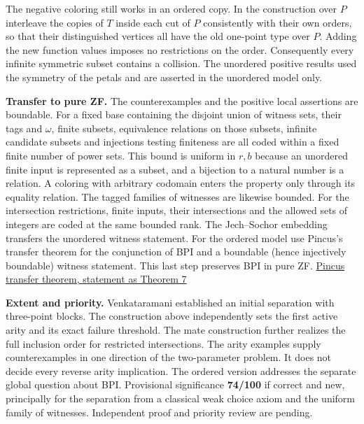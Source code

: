 \documentclass[11pt]{article}
\begin{document}
The negative coloring still works in an ordered copy. In the construction over \(P\) interleave the copies of \(T\) inside each cut of \(P\) consistently with their own orders, so that their distinguished vertices all have the old one-point type over \(P\). Adding the new function values imposes no restrictions on the order. Consequently every infinite symmetric subset contains a collision. The unordered positive results used the symmetry of the petals and are asserted in the unordered model only.

\textbf{Transfer to pure ZF.} The counterexamples and the positive local assertions are boundable. For a fixed base containing the disjoint union of witness sets, their tags and \(\omega\), finite subsets, equivalence relations on those subsets, infinite candidate subsets and injections testing finiteness are all coded within a fixed finite number of power sets. This bound is uniform in \(r,b\) because an unordered finite input is represented as a subset, and a bijection to a natural number is a relation. A coloring with arbitrary codomain enters the property only through its equality relation. The tagged families of witnesses are likewise bounded. For the intersection restrictions, finite inputs, their intersections and the allowed sets of integers are coded at the same bounded rank. The Jech--Sochor embedding transfers the unordered witness statement. For the ordered model use Pincus's transfer theorem for the conjunction of BPI and a boundable (hence injectively boundable) witness statement. This last step preserves BPI in pure ZF. \href{https://doi.org/10.1007/s00605-021-01582-0}{Pincus transfer theorem, statement as Theorem 7}

\textbf{Extent and priority.} Venkataramani established an initial separation with three-point blocks. The construction above independently sets the first active arity and its exact failure threshold. The mate construction further realizes the full inclusion order for restricted intersections. The arity examples supply counterexamples in one direction of the two-parameter problem. It does not decide every reverse arity implication. The ordered version addresses the separate global question about BPI. Provisional significance \textbf{74/100} if correct and new, principally for the separation from a classical weak choice axiom and the uniform family of witnesses. Independent proof and priority review are pending.
\end{document}
